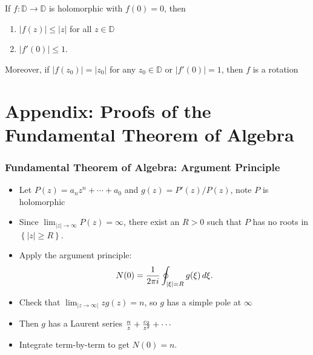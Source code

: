 \begin{theorem}

If \(f: {\mathbb{D}}\to {\mathbb{D}}\) is holomorphic with \(f(0) = 0\),
then

\begin{enumerate}
\def\labelenumi{\arabic{enumi}.}
\tightlist
\item
  \({\left\lvert {f(z)} \right\rvert} \leq {\left\lvert {z} \right\rvert}\)
  for all \(z\in {\mathbb{D}}\)
\item
  \({\left\lvert {f'(0)} \right\rvert} \leq 1\).
\end{enumerate}

Moreover, if
\({\left\lvert {f(z_0)} \right\rvert} = {\left\lvert {z_0} \right\rvert}\)
for any \(z_0\in {\mathbb{D}}\) or
\({\left\lvert {f'(0)} \right\rvert} = 1\), then \(f\) is a rotation

\end{theorem}

\hypertarget{appendix-proofs-of-the-fundamental-theorem-of-algebra}{%
\section{Appendix: Proofs of the Fundamental Theorem of
Algebra}\label{appendix-proofs-of-the-fundamental-theorem-of-algebra}}

\hypertarget{fundamental-theorem-of-algebra-argument-principle}{%
\subsubsection{Fundamental Theorem of Algebra: Argument
Principle}\label{fundamental-theorem-of-algebra-argument-principle}}

\begin{itemize}
\tightlist
\item
  Let \(P(z) = a_nz^n + \cdots + a_0\) and \(g(z) = P'(z)/P(z)\), note
  \(P\) is holomorphic
\item
  Since
  \(\lim_{{\left\lvert {z} \right\rvert} \to \infty} P(z) = \infty\),
  there exist an \(R>0\) such that \(P\) has no roots in
  \(\left\{{{\left\lvert {z} \right\rvert} \geq R}\right\}\).
\item
  Apply the argument principle:
  \begin{align*}     N(0) = {1\over 2\pi i} \oint_{{\left\lvert {\xi} \right\rvert} = R} g(\xi) \,d\xi     .\end{align*}
\item
  Check that
  \(\lim_{{\left\lvert {z\to \infty} \right\rvert}}zg(z) = n\), so \(g\)
  has a simple pole at \(\infty\)
\item
  Then \(g\) has a Laurent series
  \({n\over z} + {c_2 \over z^2} + \cdots\)
\item
  Integrate term-by-term to get \(N(0) = n\).
\end{itemize}

